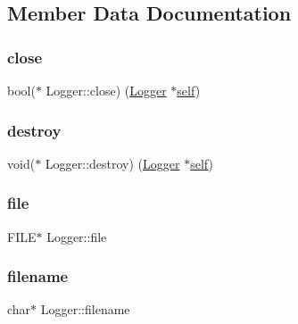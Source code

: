 \subsection{Member Data Documentation}
\mbox{\label{structLogger_a13192d1a123f8373bc8f9d680c8a8528}} 
\subsubsection{\texorpdfstring{close}{close}}
{\footnotesize\ttfamily bool($\ast$  Logger\+::close) (\hyperlink{structLogger}{Logger} $\ast$\hyperlink{structLogger_a220cd94b89be365dba07df9cbdf2d15f}{self})}

\mbox{\label{structLogger_ab665b6bcc0afa850994e8ad4cc4e6c4f}} 
\subsubsection{\texorpdfstring{destroy}{destroy}}
{\footnotesize\ttfamily void($\ast$  Logger\+::destroy) (\hyperlink{structLogger}{Logger} $\ast$\hyperlink{structLogger_a220cd94b89be365dba07df9cbdf2d15f}{self})}

\mbox{\label{structLogger_ad00c914c1f38de6d069cb788b9074d8f}} 
\subsubsection{\texorpdfstring{file}{file}}
{\footnotesize\ttfamily F\+I\+LE$\ast$ Logger\+::file}

\mbox{\label{structLogger_a4a7913dbecc583e935e8c18ec62716ab}} 
\subsubsection{\texorpdfstring{filename}{filename}}
{\footnotesize\ttfamily char$\ast$ Logger\+::filename}

\mbox{\label{structLogger_a8b371035a67cc1da7cd1c0d0ae5dd69d}} 
